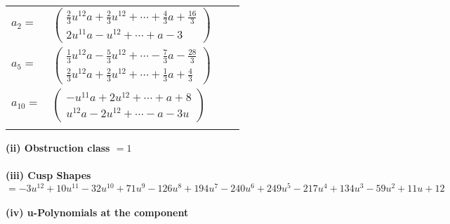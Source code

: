 \documentclass[1p]{elsarticle_modified}
\theoremstyle{definition}
\begin{document}
\begin{tabular}{m{7pt} m{180pt} m{7pt} m{180pt} }
\flushright $a_{2}=$&$\begin{pmatrix}\frac{2}{3} u^{12} a+\frac{2}{3} u^{12}+\cdots+\frac{4}{3} a+\frac{16}{3}\\2 u^{11} a- u^{12}+\cdots+a-3\end{pmatrix}$ \\
\flushright $a_{5}=$&$\begin{pmatrix}\frac{1}{3} u^{12} a-\frac{5}{3} u^{12}+\cdots-\frac{7}{3} a-\frac{28}{3}\\\frac{2}{3} u^{12} a+\frac{2}{3} u^{12}+\cdots+\frac{1}{3} a+\frac{4}{3}\end{pmatrix}$ \\
\flushright $a_{10}=$&$\begin{pmatrix}- u^{11} a+2 u^{12}+\cdots+a+8\\u^{12} a-2 u^{12}+\cdots- a-3 u\end{pmatrix}$\\&\end{tabular}
\flushleft \textbf{(ii) Obstruction class $= 1$}\\~\\
\flushleft \textbf{(iii) Cusp Shapes $= -3 u^{12}+10 u^{11}-32 u^{10}+71 u^9-126 u^8+194 u^7-240 u^6+249 u^5-217 u^4+134 u^3-59 u^2+11 u+12$}\\~\\
\newpage\renewcommand{\arraystretch}{1}
\flushleft \textbf{(iv) u-Polynomials at the component}\newline \\
\end{document}
